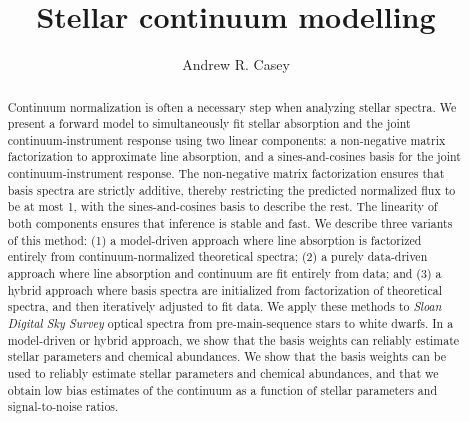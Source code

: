 \documentclass[modern]{aastex631}
\newcommand{\project}[1]{\textit{#1}}
\begin{document}
\title{\Huge Stellar continuum modelling}

\author[0000-0003-0174-0564]{Andrew R. Casey}


\begin{abstract}\noindent
Continuum normalization is often a necessary step when analyzing stellar spectra. 
We present a forward model to simultaneously fit stellar absorption and the joint continuum-instrument response using two linear components: a non-negative matrix factorization to approximate line absorption, and a sines-and-cosines basis for the joint continuum-instrument response.
The non-negative matrix factorization ensures that basis spectra are strictly additive, thereby restricting the predicted normalized flux to be at most 1, with the sines-and-cosines basis to describe the rest.
The linearity of both components ensures that inference is stable and fast.
We describe three variants of this method:
    (1) a model-driven approach where line absorption is factorized entirely from continuum-normalized theoretical spectra;
    (2) a purely data-driven approach where line absorption and continuum are fit entirely from data;
    and
    (3) a hybrid approach where basis spectra are initialized from factorization of theoretical spectra, and then iteratively adjusted to fit data. 
We apply these methods to \project{Sloan Digital Sky Survey} optical spectra 
from pre-main-sequence stars to white dwarfs.
In a model-driven or hybrid approach, we show that the basis weights can reliably estimate stellar parameters and chemical abundances.
We show that the basis weights can be used to reliably estimate stellar parameters and chemical abundances, 
and that we obtain low bias estimates of the continuum as a function of stellar parameters and signal-to-noise ratios.
\end{abstract}
\end{document}
